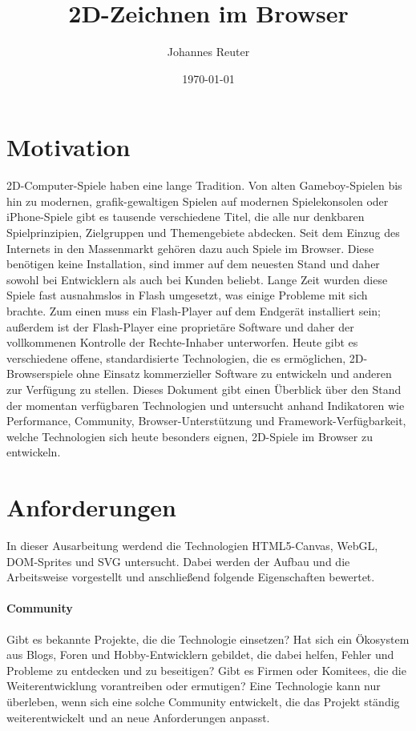 \documentclass[a4paper, 12pt]{article}
\title{2D-Zeichnen im Browser}
\author{Johannes Reuter}
\date{\today}
\begin{document}
\maketitle
\newpage
\tableofcontents
\newpage
\section{Motivation}
2D-Computer-Spiele haben eine lange Tradition. Von alten Gameboy-Spielen bis hin zu modernen, grafik-gewaltigen Spielen auf modernen Spielekonsolen oder iPhone-Spiele gibt es tausende verschiedene Titel, die alle nur denkbaren Spielprinzipien, Zielgruppen und Themengebiete abdecken. Seit dem Einzug des Internets in den Massenmarkt gehören dazu auch Spiele im Browser.
Diese benötigen keine Installation, sind immer auf dem neuesten Stand und daher sowohl bei Entwicklern als auch bei Kunden beliebt. Lange Zeit wurden diese Spiele fast ausnahmslos in Flash umgesetzt, was einige Probleme mit sich brachte. Zum einen muss ein Flash-Player auf dem Endgerät installiert sein; außerdem ist der Flash-Player eine proprietäre Software und daher der vollkommenen Kontrolle der Rechte-Inhaber unterworfen. Heute gibt es verschiedene offene, standardisierte Technologien, die es ermöglichen, 2D-Browserspiele ohne Einsatz kommerzieller Software zu entwickeln und anderen zur Verfügung zu stellen. Dieses Dokument gibt einen Überblick über den Stand der momentan verfügbaren Technologien und untersucht anhand Indikatoren wie Performance, Community, Browser-Unterstützung und Framework-Verfügbarkeit, welche Technologien sich heute besonders eignen, 2D-Spiele im Browser zu entwickeln.
\section{Anforderungen}
In dieser Ausarbeitung werdend die Technologien HTML5-Canvas, WebGL, DOM-Sprites und SVG untersucht. Dabei werden der Aufbau und die Arbeitsweise vorgestellt und anschließend folgende Eigenschaften bewertet.
\paragraph{Community}
Gibt es bekannte Projekte, die die Technologie einsetzen? Hat sich ein Ökosystem aus Blogs, Foren und Hobby-Entwicklern gebildet, die dabei helfen, Fehler und Probleme zu entdecken und zu beseitigen? Gibt es Firmen oder Komitees, die die Weiterentwicklung vorantreiben oder ermutigen? Eine Technologie kann nur überleben, wenn sich eine solche Community entwickelt, die das Projekt ständig weiterentwickelt und an neue Anforderungen anpasst.
\end{document}
